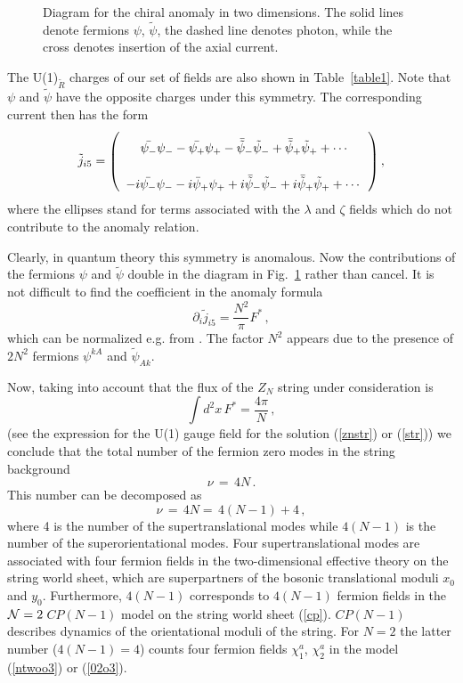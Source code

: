 \documentclass[epsfig,12pt]{article}
\def\beq{\begin{equation}}
\def\eeq{\end{equation}}
\newcommand{\ntwo}{${\cal N}=2\;$}
\newcommand{\pt}{\partial}
\begin{document}
\begin{figure}[h]
\epsfxsize=8cm
\centerline{}
\caption{\footnotesize
Diagram for the chiral anomaly in two dimensions. The solid lines denote fermions
$\psi$, $\tilde{\psi}$, the dashed line denotes photon, while the cross denotes
insertion of the axial current.}
\label{figanom}
\end{figure}

The U(1)$_{\tilde{R}}$ charges of our set of fields  are also shown in Table~\ref{table1}. Note that  $\psi$
and $\tilde{\psi}$ have the opposite charges under this symmetry. The corresponding 
current then has the form
\beq
\tilde{j}_{i5}=
\left(
\begin{array}{c}
\rule{0mm}{6mm} \bar{\psi_{-}}\psi_{-}-\bar{\psi_{+}}\psi_{+} 
-\bar{\tilde{\psi}}_{-}\tilde{\psi}_{-} +\bar{\tilde{\psi}}_{+}\tilde{\psi}_{+}
+\cdots\\[3mm]
-i\bar{\psi_{-}}\psi_{-}-i\bar{\psi}_{+}\psi_{+} 
+i\bar{\tilde{\psi}}_{-}\tilde{\psi}_{-} +i\bar{\tilde{\psi}}_{+}\tilde{\psi}_{+}
+\cdots
\rule{0mm}{6mm}\\
\end{array}
\right),
\label{current}
\eeq
where the ellipses stand for terms associated with  the $\lambda$ and $\zeta$ 
fields which do not contribute to the anomaly relation.

Clearly, in  quantum theory this symmetry is anomalous. Now the contributions
of the fermions $\psi$  and  $\tilde{\psi}$ double in the diagram in 
Fig.~\ref{figanom} rather than cancel. It is not difficult
to find the coefficient in the anomaly formula
\beq
\pt_i\tilde{j}_{i5} = \frac{N^2}{\pi} F^{*} \,,
\label{anom}
\eeq
which can be normalized e.g. from \cite{ShVa}.  The factor $N^2$ appears
due to the presence of $2N^2$ fermions $\psi^{kA}$ and $\tilde{\psi}_{Ak}$.

Now, taking into account that the flux of the $Z_N$ string under consideration is
\beq
\int d^2 x \,F^{*}=\frac{4\pi}{N}\, ,
\label{flux}
\eeq
(see the  expression for the U(1) gauge field for  the solution (\ref{znstr})
or (\ref{str})) we conclude that the total number of the fermion zero modes
in the string background 
\beq
\nu\,= \,4N \,.
\label{number}
\eeq
This number can be decomposed as 
\beq
\nu\,= \,4N= \, 4(N-1)+4\,,
\label{splitnumber}
\eeq
where 4 is the number of the supertranslational modes while
$4(N-1)$ is the number of the superorientational modes. Four supertranslational modes
are associated with four fermion fields in the two-dimensional effective 
theory on the string world sheet, which are superpartners of the bosonic translational
moduli $x_0$ and $y_0$. Furthermore, $4(N-1)$ corresponds to $4(N-1)$ fermion fields in the  \ntwo $CP(N-1)$ model on the string world sheet (\ref{cp}).  $CP(N-1)$ describes  dynamics of the orientational moduli of the string.
 For $N=2$ the latter number ($4(N-1)=4$) counts four fermion fields $\chi_1^a$,
$\chi_2^a$ in the model (\ref{ntwoo3}) or (\ref{02o3}).
\end{document}
